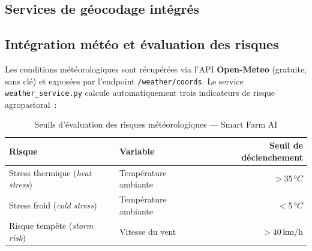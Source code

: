 \subsection{Services de géocodage intégrés}

\begin{table}[H]
\centering
\caption{Services de géocodage utilisés dans le module MapCenter}
\label{tab:geocoding_services}
%
\end{table}

\subsection{Intégration météo et évaluation des risques}

Les conditions météorologiques sont récupérées via l'API \textbf{Open-Meteo}
(gratuite, sans clé) et exposées par l'endpoint \texttt{/weather/coords}.
Le service \texttt{weather\_service.py} calcule automatiquement trois indicateurs
de risque agropastoral~:

\begin{table}[H]
\centering
\caption{Seuils d'évaluation des risques météorologiques --- Smart Farm AI}
\label{tab:weather_risks}
\begin{tabular}{llr}
\toprule
\textbf{Risque} & \textbf{Variable} & \textbf{Seuil de déclenchement} \\
\midrule
Stress thermique (\textit{heat stress}) & Température ambiante & $> 35\,°C$ \\
Stress froid (\textit{cold stress})     & Température ambiante & $< 5\,°C$ \\
Risque tempête (\textit{storm risk})    & Vitesse du vent       & $> 40$\,km/h \\
\bottomrule
\end{tabular}
\end{table}

